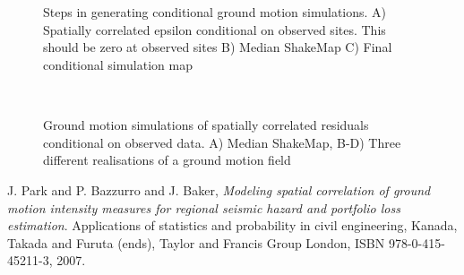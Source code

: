 \documentclass[11pt, oneside]{article}   	%
\begin{document}
\begin{figure}
 \\
\\
\caption{Steps in generating conditional ground motion simulations. A) Spatially correlated epsilon conditional on observed sites. This should be zero at observed sites B) Median ShakeMap C) Final conditional simulation map}
\label{steps}
\end{figure}

\begin{figure}
\\
\caption{Ground motion simulations of spatially correlated residuals conditional on observed data. A) Median ShakeMap, B-D) Three different realisations of a ground motion field}
\label{gmfs}
\end{figure}

\begin{thebibliography}{9}

  J. Park and P. Bazzurro and J. Baker,
  \emph{Modeling spatial correlation of ground motion intensity measures for regional seismic hazard and portfolio loss estimation}.
  Applications of statistics and probability in civil engineering, Kanada, Takada and Furuta (ends),
  Taylor and Francis Group London, ISBN 978-0-415-45211-3,
  2007.

\end{thebibliography}
\end{document}
